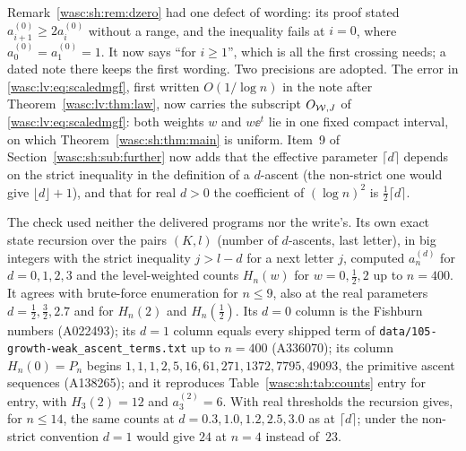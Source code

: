 \documentclass[11pt,a4paper]{article}
\newcommand{\file}[1]{\nolinkurl{#1}}
\theoremstyle{remark}\newtheorem{remark}[theorem]{Remark}
\numberwithin{equation}{section}
\begin{document}
Remark~\ref{wasc:sh:rem:dzero} had one defect of wording: its proof stated $a^{(0)}_{i+1}\ge2a^{(0)}_i$ without a range, and the inequality fails at $i=0$, where $a^{(0)}_0=a^{(0)}_1=1$. It now says ``for $i\ge1$'', which is all the first crossing needs; a dated note there keeps the first wording. Two precisions are adopted. The error in \eqref{wasc:lv:eq:scaledmgf}, first written $O(1/\log n)$ in the note after Theorem~\ref{wasc:lv:thm:law}, now carries the subscript $O_{\mathcal W,J}$ of \eqref{wasc:lv:eq:scaledmgf}: both weights $w$ and $w\ee^t$ lie in one fixed compact interval, on which Theorem~\ref{wasc:sh:thm:main} is uniform. Item~9 of Section~\ref{wasc:sh:sub:further} now adds that the effective parameter $\lceil d\rceil$ depends on the strict inequality in the definition of a $d$-ascent (the non-strict one would give $\lfloor d\rfloor+1$), and that for real $d>0$ the coefficient of $(\log n)^2$ is $\frac12\lceil d\rceil$.

The check used neither the delivered programs nor the write's. Its own exact state recursion over the pairs $(K,l)$ (number of $d$-ascents, last letter), in big integers with the strict inequality $j>l-d$ for a next letter $j$, computed $a^{(d)}_n$ for $d=0,1,2,3$ and the level-weighted counts $H_n(w)$ for $w=0,\frac12,2$ up to $n=400$. It agrees with brute-force enumeration for $n\le9$, also at the real parameters $d=\frac12,\frac32,2.7$ and for $H_n(2)$ and $H_n(\frac12)$. Its $d=0$ column is the Fishburn numbers (A022493); its $d=1$ column equals every shipped term of \file{data/105-growth-weak_ascent_terms.txt} up to $n=400$ (A336070); its column $H_n(0)=P_n$ begins $1,1,1,2,5,16,61,271,1372,7795,49093$, the primitive ascent sequences (A138265); and it reproduces Table~\ref{wasc:sh:tab:counts} entry for entry, with $H_3(2)=12$ and $a^{(2)}_3=6$. With real thresholds the recursion gives, for $n\le14$, the same counts at $d=0.3,1.0,1.2,2.5,3.0$ as at $\lceil d\rceil$; under the non-strict convention $d=1$ would give $24$ at $n=4$ instead of~$23$.
\end{document}

